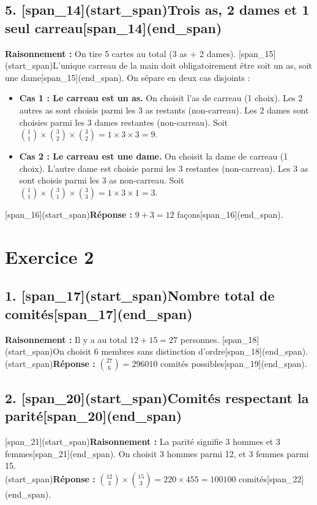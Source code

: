 \documentclass[11pt,a4paper]{article}
\begin{document}
\subsection*{5. [span_14](start_span)Trois as, 2 dames et 1 seul carreau[span_14](end_span)}
\textbf{Raisonnement :} On tire 5 cartes au total (3 as + 2 dames). [span_15](start_span)L'unique carreau de la main doit obligatoirement être soit un as, soit une dame[span_15](end_span). On sépare en deux cas disjoints :
\begin{itemize}
    \item \textbf{Cas 1 : Le carreau est un as.} On choisit l'as de carreau (1 choix). Les 2 autres as sont choisis parmi les 3 as restants (non-carreau). Les 2 dames sont choisies parmi les 3 dames restantes (non-carreau). Soit $\binom{1}{1} \times \binom{3}{2} \times \binom{3}{2} = 1 \times 3 \times 3 = 9$.
    \item \textbf{Cas 2 : Le carreau est une dame.} On choisit la dame de carreau (1 choix). L'autre dame est choisie parmi les 3 restantes (non-carreau). Les 3 as sont choisis parmi les 3 as non-carreau. Soit $\binom{1}{1} \times \binom{3}{1} \times \binom{3}{3} = 1 \times 3 \times 1 = 3$.
\end{itemize}
[span_16](start_span)\textbf{Réponse :} $9 + 3 = 12$ façons[span_16](end_span).

\hrulefill

\section*{Exercice 2}

\subsection*{1. [span_17](start_span)Nombre total de comités[span_17](end_span)}
\textbf{Raisonnement :} Il y a au total $12 + 15 = 27$ personnes. [span_18](start_span)On choisit 6 membres sans distinction d'ordre[span_18](end_span).\\
[span_19](start_span)\textbf{Réponse :} $\binom{27}{6} = 296010$ comités possibles[span_19](end_span).

\subsection*{2. [span_20](start_span)Comités respectant la parité[span_20](end_span)}
[span_21](start_span)\textbf{Raisonnement :} La parité signifie 3 hommes et 3 femmes[span_21](end_span). On choisit 3 hommes parmi 12, et 3 femmes parmi 15.\\
[span_22](start_span)\textbf{Réponse :} $\binom{12}{3} \times \binom{15}{3} = 220 \times 455 = 100100$ comités[span_22](end_span).
\end{document}
